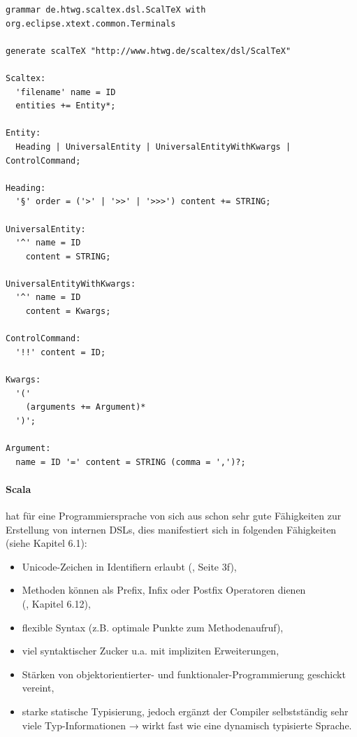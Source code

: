 \begin{lstlisting}[label=xtext-gramm,caption=An Scala-DSL angelehnte Xtext-Grammatik.]
grammar de.htwg.scaltex.dsl.ScalTeX with org.eclipse.xtext.common.Terminals

generate scalTeX "http://www.htwg.de/scaltex/dsl/ScalTeX"

Scaltex:
  'filename' name = ID
  entities += Entity*;

Entity:
  Heading | UniversalEntity | UniversalEntityWithKwargs | ControlCommand;

Heading:
  '§' order = ('>' | '>>' | '>>>') content += STRING;

UniversalEntity:
  '^' name = ID
    content = STRING;

UniversalEntityWithKwargs:
  '^' name = ID
    content = Kwargs;

ControlCommand:
  '!!' content = ID;

Kwargs:
  '('
    (arguments += Argument)*
  ')';

Argument:
  name = ID '=' content = STRING (comma = ',')?;
\end{lstlisting}

\paragraph{Scala} hat für eine Programmiersprache von sich aus schon
sehr gute Fähigkeiten zur Erstellung von internen DSLs, dies
manifestiert sich in folgenden Fähigkeiten (siehe \cite{dsls} Kapitel 6.1):

\begin{itemize}
  \item Unicode-Zeichen in Identifiern erlaubt (\cite{scala-ref}, Seite 3f),
  \item Methoden können als Prefix, Infix oder Postfix Operatoren dienen\\(\cite{scala-ref}, Kapitel 6.12),
  \item flexible Syntax (z.B. optimale Punkte zum Methodenaufruf),
  \item viel syntaktischer Zucker u.a. mit impliziten Erweiterungen,
  \item Stärken von objektorientierter- und funktionaler-Programmierung
        geschickt vereint,
  \item starke statische Typisierung, jedoch ergänzt der Compiler selbstständig
        sehr viele Typ-Informationen → wirkt fast wie eine dynamisch
        typisierte Sprache.
\end{itemize}

